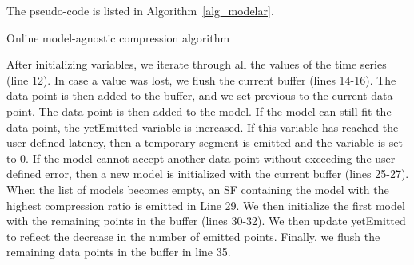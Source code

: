 The pseudo-code is listed in Algorithm~\ref{alg_modelar}.
\begin{algorithm}
\caption{Online model-agnostic compression algorithm \cite{jensen_2018_modelardb}}\label{alg_modelar}
\begin{algorithmic}[1]


    \EndIf
        \EndIf
    \Else
    \EndIf
\EndWhile
{}
\EndProcedure
\end{algorithmic}
\end{algorithm}

After initializing variables, we iterate through all the values of the time series (line 12).
In case a value was lost, we flush the current buffer (lines 14-16). The data point is then
added to the buffer, and we set previous to the current data point. The data point is then
added to the model. If the model can still fit the data point, the yetEmitted variable is
increased. If this variable has reached the user-defined latency, then a temporary segment
is emitted and the variable is set to 0.
If the model cannot accept another data point without exceeding the user-defined error,
then a new model is initialized with the current buffer (lines 25-27). When the list of
models becomes empty, an SF containing the model with the highest compression ratio is
emitted in Line 29. We then initialize the first model with the remaining points in the
buffer (lines 30-32).
We then update yetEmitted to reflect the decrease in the number of emitted points.
Finally, we flush the remaining data points in the buffer in line 35.

